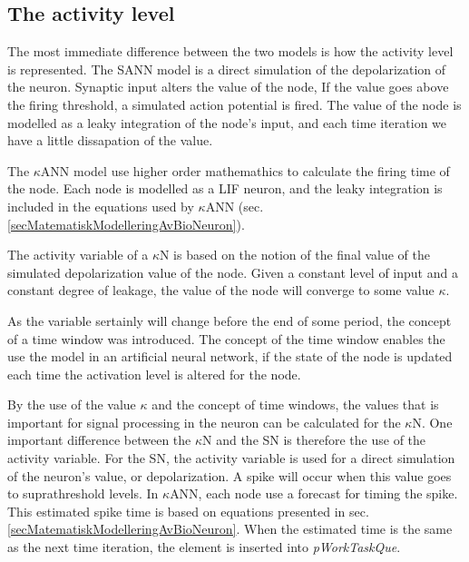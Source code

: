 	\subsection{The activity level}
	
	The most immediate difference between the two models is how the activity level is represented.
	The SANN model is a direct simulation of the depolarization of the neuron. 
	Synaptic input alters the value of the node, 
	If the value goes above the firing threshold, a simulated action potential is fired.
	The value of the node is modelled as a leaky integration of the node's input, and each time iteration we have a little dissapation of the value.

	The $\kappa$ANN model use higher order mathemathics to calculate the firing time of the node. %
	Each node is modelled as a LIF neuron, and the leaky integration is included in the equations used by $\kappa$ANN (sec. \ref{secMatematiskModelleringAvBioNeuron}).
	
	The activity variable of a $\kappa$N is based on the notion of the final value of the simulated depolarization value of the node.
	Given a constant level of input and a constant degree of leakage, the value of the node will converge to some value $\kappa$.

	As the variable sertainly will change before the end of some period, the concept of a time window was introduced.
	The concept of the time window enables the use the model in an artificial neural network, if the state of the node is updated each time the activation level is altered for the node.

	By the use of the value $\kappa$ and the concept of time windows, the values that is important for signal processing in the neuron can be calculated for the $\kappa$N.
	One important difference between the $\kappa$N and the SN is therefore the use of the activity variable.
	For the SN, the activity variable is used for a direct simulation of the neuron's value, or depolarization.
	A spike will occur when this value goes to suprathreshold levels.
	In $\kappa$ANN, each node use a forecast for timing the spike.
	This estimated spike time is based on equations presented in sec. \ref{secMatematiskModelleringAvBioNeuron}. %
	When the estimated time is the same as the next time iteration, the element is inserted into \emph{pWorkTaskQue}.


